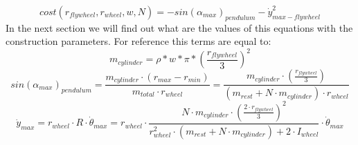 \begin{equation}
	cost(r_{flywheel},r_{wheel},w,N) = - sin(\alpha_{max})_{pendulum} -\dot{y}^2_{max-flywheel}
	\label{eq: cost}
\end{equation}
In the next section we will find out what are the values 
of this equations with the construction parameters. 
For reference this terms are equal to:
\begin{equation*}
	m_{cylinder} = \rho * w * \pi * (\frac{r_{flywheel}}{3})^2
\end{equation*}
\begin{equation*}
	sin(\alpha_{max})_{pendulum} = \frac{m_{cylinder} \cdot  (r_{max} - r_{min})}{m_{total} \cdot r_{wheel}} = \frac{m_{cylinder} \cdot  (\frac{r_{flywheel}}{3})}{(m_{rest} + N \cdot m_{cylinder})\cdot r_{wheel}} 	
\end{equation*}
\begin{equation*}
	\dot{y}_{max} = r_{wheel} \cdot  R \cdot  \dot{\theta}_{max} =r_{wheel} \cdot  \frac{ N \cdot  m_{cylinder} \cdot  (\frac{2\cdot r_{flywheel}}{3})^2}
    {r_{wheel}^2\cdot (m_{rest} + N \cdot m_{cylinder}) +  2\cdot I_{wheel}} \cdot  \dot{\theta}_{max}
\end{equation*}
